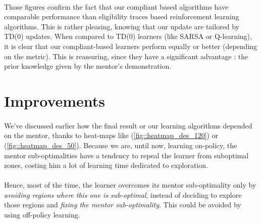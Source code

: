 \documentclass[a4paper]{report}
\begin{document}
{{{			\paragraph{} Those figures confirm the fact that our compliant based algorithms have comparable performance than eligibility traces based reinforcement learning algorithms. This is rather pleasing, knowing that our update are tailored by TD(0) updates. When compared to TD(0) learners (like SARSA or Q-learning), it is clear that our compliant-based learners perform equally or better (depending on the metric). This is reassuring, since they have a significant advantage : the prior knowledge given by the mentor's demonstration. 
		}
		
		\section{Improvements}
		{
			\paragraph{} We've discussed earlier how the final result or our learning algorithms depended on the mentor, thanks to heat-maps like (\ref{fig::heatmap_des_120}) or (\ref{fig::heatmap_des_50}). Because we are, until now, learning on-policy, the mentor sub-optimalities have a tendency to repeal the learner from suboptimal zones, costing him a lot of learning time dedicated to exploration. 
			
			\paragraph{} Hence, most of the time, the learner overcomes its mentor sub-optimality only by \emph{avoiding regions where this one is sub-optimal}, instead of deciding to explore those regions and \emph{fixing the mentor sub-optimality}. This could be avoided by using off-policy learning. 
			
}}}
\end{document}
